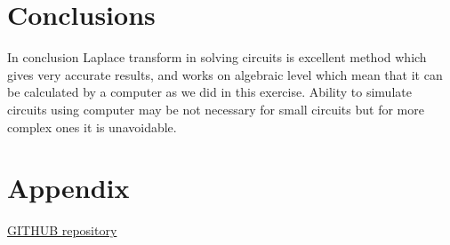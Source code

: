 \documentclass[notitlepage, a4paper, 11pt]{article}
\begin{document}
	\section{Conclusions}
	In conclusion Laplace transform in solving circuits is excellent method which gives very accurate results, and works on algebraic level which mean that it can be calculated by a computer as we did in this exercise. Ability to simulate circuits using computer may be not necessary for small circuits but for more complex ones it is unavoidable.
	
	\newpage
	\appendix
	\section{Appendix}\label{sec:appendix}
	\href{https://github.com/kamilix2003/CT_labs}{GITHUB repository}
	\inputminted{matlab}{../Matlab/main.m}
\end{document}
